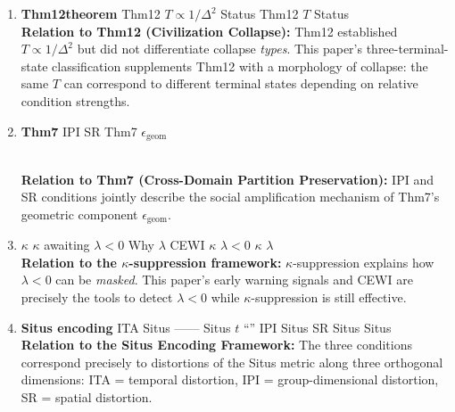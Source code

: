 \documentclass[11pt,a4paper]{article}
\theoremstyle{remark}
\newcommand{\ineq}{\Delta}
\newcommand{\coupling}{\kappa}
\newcommand{\lambdaparam}{\lambda}
\begin{document}
\begin{enumerate}
    \item \textbf{ Thm12theorem}
          Thm12  $T \propto 1/\ineq^2$ \textit{}
          Status Thm12 
           $T$ Status
          \\[2pt]
          \textbf{Relation to Thm12 (Civilization Collapse):}
          Thm12 established $T \propto 1/\ineq^2$ but did not differentiate collapse
          \textit{types}. This paper's three-terminal-state classification supplements
          Thm12 with a morphology of collapse: the same $T$ can correspond to different
          terminal states depending on relative condition strengths.

    \item \textbf{ Thm7}
          IPI  SR  Thm7  $\epsilon_{\text{geom}}$ 
          
          \\[2pt]
          \textbf{Relation to Thm7 (Cross-Domain Partition Preservation):}
          IPI and SR conditions jointly describe the social amplification mechanism
          of Thm7's geometric component $\epsilon_{\text{geom}}$.

    \item \textbf{ $\coupling$ }
          $\coupling$ awaiting $\lambdaparam < 0$ Why
          $\lambdaparam$\textit{}
           CEWI  $\coupling$  $\lambdaparam < 0$ 
          $\coupling$ $\lambdaparam$ 
          \\[2pt]
          \textbf{Relation to the $\coupling$-suppression framework:}
          $\coupling$-suppression explains how $\lambdaparam < 0$ can be \textit{masked}.
          This paper's early warning signals and CEWI are precisely the tools to detect
          $\lambdaparam < 0$ while $\coupling$-suppression is still effective.

    \item \textbf{ Situs encoding}
          ITA  Situs ——
           Situs  $t$ ``''
          IPI  Situs 
          SR  Situs 
           Situs 
          \\[2pt]
          \textbf{Relation to the Situs Encoding Framework:}
          The three conditions correspond precisely to distortions of the Situs metric
          along three orthogonal dimensions: ITA = temporal distortion,
          IPI = group-dimensional distortion, SR = spatial distortion.
\end{enumerate}

\section{}
\end{document}
